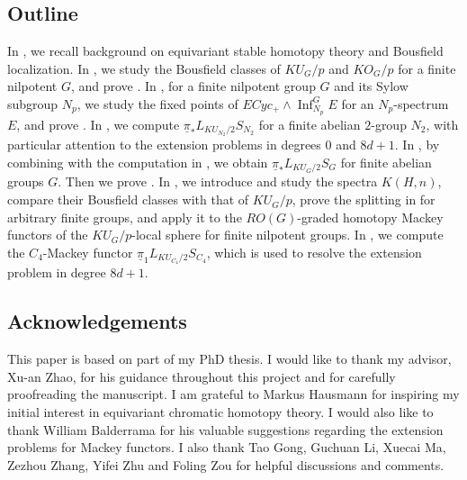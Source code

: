 \documentclass{amsart}
\theoremstyle{plain}
\theoremstyle{definition}
\theoremstyle{remark}
\begin{document}
    


    \subsection{Outline}
    In , we recall background on equivariant stable homotopy theory and Bousfield localization.
    In , we study the Bousfield classes of $KU_G/p$ and $KO_G/p$ for a finite nilpotent $G$, and prove . 
    In , for a finite nilpotent group $G$ and its Sylow subgroup $N_p$, we study the fixed points of $ECyc_+\wedge \operatorname{Inf}_{N_p}^G E$ for an $N_p$-spectrum $E$, and prove . 
    In , we compute $\underline{\pi}_\ast L_{KU_{N_2}/2}S_{N_2}$ for a finite abelian $2$-group $N_2$, with particular attention to the extension problems in degrees $0$ and $8d+1$. 
    In , by combining  with the computation in , we obtain $\underline{\pi}_\ast L_{KU_G/2}S_G$ for finite abelian groups $G$. Then we prove . 
    In , we introduce and study the spectra $K(H,n)$, compare their Bousfield classes with that of $KU_G/p$, prove the splitting in  for arbitrary finite groups, and apply it to the $RO(G)$-graded homotopy Mackey functors of the $KU_G/p$-local sphere for finite nilpotent groups. 
    In , we compute the $C_4$-Mackey functor $\underline{\pi}_1 L_{KU_{C_4}/2}S_{C_4}$, which is used to resolve the extension problem in degree $8d+1$.

    \subsection*{Acknowledgements}

    This paper is based on part of my PhD thesis. I would like to thank my advisor, Xu-an Zhao, for his guidance throughout this project and for carefully proofreading the manuscript. I am grateful to Markus Hausmann for inspiring my initial interest in equivariant chromatic homotopy theory. I would also like to thank William Balderrama for his valuable suggestions regarding the extension problems for Mackey functors. I also thank Tao Gong, Guchuan Li, Xuecai Ma, Zezhou Zhang, Yifei Zhu and Foling Zou for helpful discussions and comments.
\end{document}
